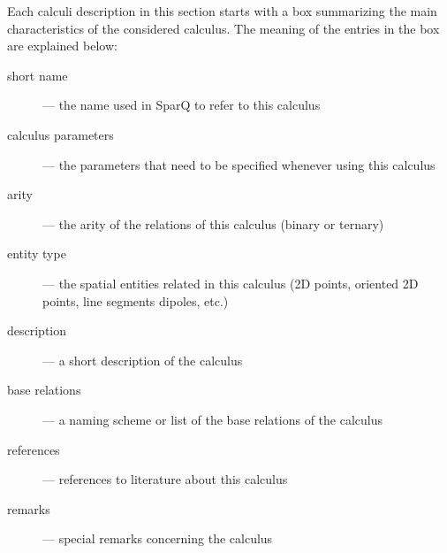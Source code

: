 \documentclass[headsepline]{scrreprt}
\theoremstyle{definition}
\newcommand{\engine}{SparQ}
\begin{document}
Each calculi description in this section starts with a box summarizing the main characteristics of the considered calculus. The meaning of the entries in the box are explained below:

\begin{description}
\item[short name] --- the name used in \engine{} to refer to this calculus
\item[calculus parameters] --- the parameters that need to be specified whenever using this calculus
\item[arity] --- the arity of the relations of this calculus (binary or ternary)
\item[entity type] --- the spatial entities related in this calculus (2D points, oriented 2D points, line segments dipoles, etc.)
\item[description] --- a short description of the calculus
\item[base relations] --- a naming scheme or list of the base relations of the calculus
\item[references] --- references to literature about this calculus
\item[remarks] --- special remarks concerning the calculus
\end{description}

\end{document}
